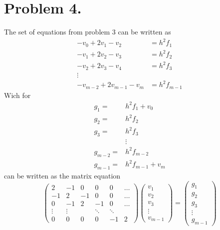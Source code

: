 \documentclass[english,notitlepage]{revtex4-1}  %
\begin{document}
\section*{Problem 4.}
    \label{sec:oppgave4}
    The set of equations from problem 3 can be written as 
    \begin{align*}
            -v_0 + 2v_1 - v_2 
        &=  h^2 f_1\\
            -v_1 + 2v_2 -v_3 
        &=  h^2 f_2\\
            -v_2 + 2v_3- v_4 
        &=  h^2 f_3\\
        \vdots&\\
            -v_{m-2} + 2 v_{m-1} - v_m
        &=  h^2 f_{m-1}
    \end{align*}
    Wich for 
    \begin{align*}
            g_1
        =&  h^2 f_1 + v_0\\
            g_2
        =&  h^2 f_2\\
            g_3
        =&  h^2 f_3\\
        &\vdots\\
            g_{m - 2}
        =&  h^2 f_{m-2}\\
            g_{m-1}
        =&  h^2 f_{m-1} + v_{m}
    \end{align*}
    can be written as the matrix equation
    \begin{equation*}
            \begin{pmatrix}
                2 & -1 & 0 &0 & 0 & \dots
                \\
                -1 & 2 & -1 & 0 & 0 & \dots
                \\
                0 & -1 & 2 & -1 & 0 & \dots
                \\
                \vdots & \vdots & & \ddots & \ddots
                \\
                0 & 0 & 0 & 0 & -1 & 2 
            \end{pmatrix}
            \begin{pmatrix}
                v_1 \\ v_2 \\ v_3 \\ \vdots \\ v_{m - 1} 
            \end{pmatrix} 
        =   \begin{pmatrix}
                g_1 \\ g_2 \\ g_3 \\ \vdots \\ g_{m - 1}
            \end{pmatrix}
    \end{equation*}
\end{document}
